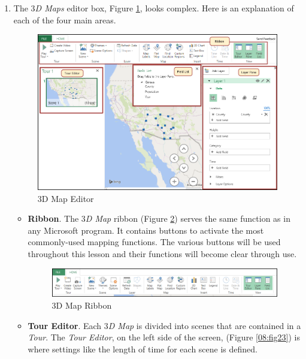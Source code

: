 \begin{enumerate}[resume]
	\item The \textit{$ 3 $D Maps} editor box, Figure \ref{08:fig21}, looks complex. Here is an explanation of each of the four main areas.

	\begin{figure}[H]
		\centering
		\includegraphics[width=\maxwidth{.95\linewidth}]{gfx/ch08_fig21}
		\caption{$ 3 $D Map Editor}
		\label{08:fig21}
	\end{figure}
	
	\begin{itemize}
		\item \textbf{Ribbon}. The \textit{$ 3 $D Map} ribbon (Figure \ref{08:fig22}) serves the same function as in any Microsoft program. It contains buttons to activate the most commonly-used mapping functions. The various buttons will be used throughout this lesson and their functions will become clear through use.

		\begin{figure}[H]
			\centering
			\includegraphics[width=\maxwidth{.95\linewidth}]{gfx/ch08_fig22}
			\caption{$ 3 $D Map Ribbon}
			\label{08:fig22}
		\end{figure}

		\item \textbf{Tour Editor}. Each \textit{$ 3 $D Map} is divided into scenes that are contained in a \textit{Tour}. The \textit{Tour Editor}, on the left side of the screen, (Figure \ref{08:fig23}) is where settings like the length of time for each scene is defined.


\end{itemize}
\end{enumerate}
